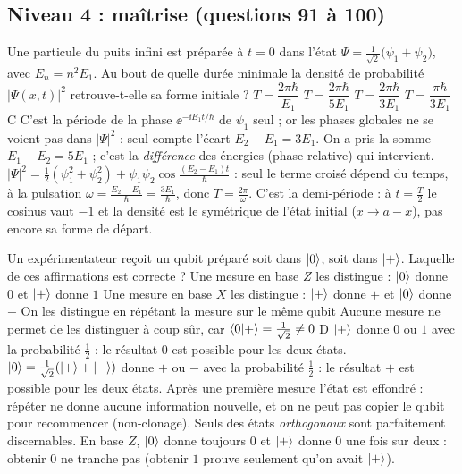 \clearpage
\subsection{Niveau 4 : maîtrise (questions 91 à 100)}\label{sec:qcm-n4}
\par\smallskip
  {Une particule du puits infini est préparée à $t=0$ dans l'état $\Psi=\frac{1}{\sqrt2}\big(\psi_1+\psi_2\big)$, avec $E_n=n^2E_1$. Au bout de quelle durée minimale la densité de probabilité $|\Psi(x,t)|^2$ retrouve-t-elle sa forme initiale ?}
  {$T=\dfrac{2\pi\hbar}{E_1}$}
  {$T=\dfrac{2\pi\hbar}{5E_1}$}
  {$T=\dfrac{2\pi\hbar}{3E_1}$}
  {$T=\dfrac{\pi\hbar}{3E_1}$}
  {C}
\qcmx
  {C'est la période de la phase $\ee^{-\ii E_1t/\hbar}$ de $\psi_1$ seul ; or les phases globales ne se voient pas dans $|\Psi|^2$ : seul compte l'écart $E_2-E_1=3E_1$.}
  {On a pris la somme $E_1+E_2=5E_1$ ; c'est la \emph{différence} des énergies (phase relative) qui intervient.}
  {$|\Psi|^2=\frac12(\psi_1^2+\psi_2^2)+\psi_1\psi_2\cos\frac{(E_2-E_1)t}{\hbar}$ : seul le terme croisé dépend du temps, à la pulsation $\omega=\frac{E_2-E_1}{\hbar}=\frac{3E_1}{\hbar}$, donc $T=\frac{2\pi}{\omega}$.}
  {C'est la demi-période : à $t=\frac T2$ le cosinus vaut $-1$ et la densité est le symétrique de l'état initial ($x\to a-x$), pas encore sa forme de départ.}

  {Un expérimentateur reçoit un qubit préparé soit dans $|0\rangle$, soit dans $|+\rangle$. Laquelle de ces affirmations est correcte ?}
  {Une mesure en base $Z$ les distingue : $|0\rangle$ donne $0$ et $|+\rangle$ donne $1$}
  {Une mesure en base $X$ les distingue : $|+\rangle$ donne $+$ et $|0\rangle$ donne $-$}
  {On les distingue en répétant la mesure sur le même qubit}
  {Aucune mesure ne permet de les distinguer à coup sûr, car $\langle 0|+\rangle=\frac{1}{\sqrt2}\neq0$}
  {D}
\qcmx
  {$|+\rangle$ donne $0$ ou $1$ avec la probabilité $\frac12$ : le résultat $0$ est possible pour les deux états.}
  {$|0\rangle=\frac{1}{\sqrt2}(|+\rangle+|-\rangle)$ donne $+$ ou $-$ avec la probabilité $\frac12$ : le résultat $+$ est possible pour les deux états.}
  {Après une première mesure l'état est effondré : répéter ne donne aucune information nouvelle, et on ne peut pas copier le qubit pour recommencer (non-clonage).}
  {Seuls des états \emph{orthogonaux} sont parfaitement discernables. En base $Z$, $|0\rangle$ donne toujours $0$ et $|+\rangle$ donne $0$ une fois sur deux : obtenir $0$ ne tranche pas (obtenir $1$ prouve seulement qu'on avait $|+\rangle$).}

